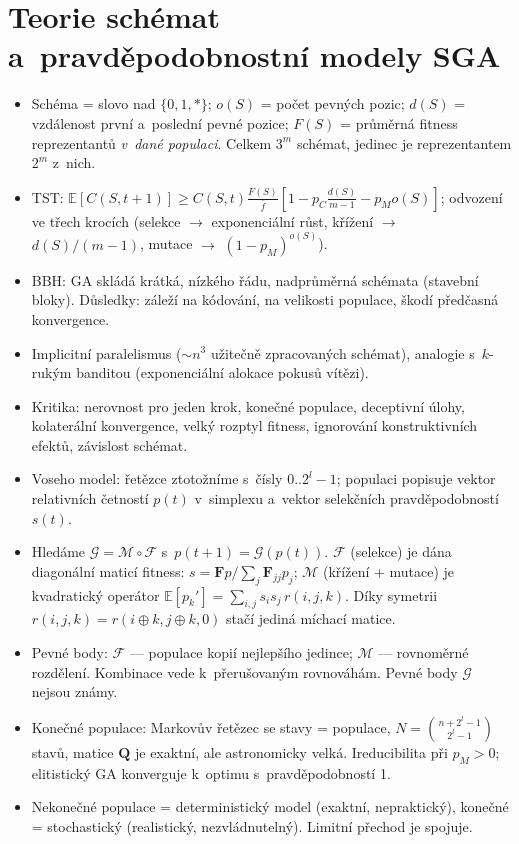 \documentclass[11pt,a4paper]{article}
\theoremstyle{definition}
\begin{document}
\section{Teorie schémat a~pravděpodobnostní modely SGA}
\begin{itemize}
\item Schéma = slovo nad $\{0,1,*\}$; $o(S)$ = počet pevných pozic;
 $d(S)$ = vzdálenost první a~poslední pevné pozice; $F(S)$ = průměrná fitness
 reprezentantů \emph{v~dané populaci}. Celkem $3^m$ schémat, jedinec je
 reprezentantem $2^m$ z~nich.
\item TST: $\mathbb{E}[C(S,t+1)] \ge C(S,t)\frac{F(S)}{\bar f}
 [1 - p_C \frac{d(S)}{m-1} - p_M o(S)]$; odvození ve třech krocích
 (selekce $\to$ exponenciální růst, křížení $\to$ $d(S)/(m-1)$,
 mutace $\to$ $(1-p_M)^{o(S)}$).
\item BBH: GA skládá krátká, nízkého řádu, nadprůměrná schémata (stavební
 bloky). Důsledky: záleží na kódování, na velikosti populace, škodí předčasná
 konvergence.
\item Implicitní paralelismus ($\sim n^3$ užitečně zpracovaných schémat),
 analogie s~$k$-rukým banditou (exponenciální alokace pokusů vítězi).
\item Kritika: nerovnost pro jeden krok, konečné populace, deceptivní úlohy,
 kolaterální konvergence, velký rozptyl fitness, ignorování konstruktivních
 efektů, závislost schémat.
\item Voseho model: řetězce ztotožníme s~čísly $0..2^l-1$; populaci popisuje
 vektor relativních četností $p(t)$ v~simplexu a~vektor selekčních
 pravděpodobností $s(t)$.
\item Hledáme $\mathcal{G} = \mathcal{M} \circ \mathcal{F}$ s~$p(t+1)=\mathcal{G}(p(t))$.
 $\mathcal{F}$ (selekce) je dána diagonální maticí fitness:
 $s = \mathbf{F}p / \sum_j \mathbf{F}_{jj}p_j$;
 $\mathcal{M}$ (křížení + mutace) je kvadratický operátor
 $\mathbb{E}[p_k'] = \sum_{i,j} s_i s_j\, r(i,j,k)$. Díky symetrii
 $r(i,j,k) = r(i\oplus k, j \oplus k, 0)$ stačí jediná míchací matice.
\item Pevné body: $\mathcal{F}$ --- populace kopií nejlepšího jedince;
 $\mathcal{M}$ --- rovnoměrné rozdělení. Kombinace vede k~přerušovaným
 rovnováhám. Pevné body $\mathcal{G}$ nejsou známy.
\item Konečné populace: Markovův řetězec se stavy = populace,
 $N = \binom{n+2^l-1}{2^l-1}$ stavů, matice $\mathbf{Q}$ je exaktní, ale
 astronomicky velká. Ireducibilita při $p_M>0$; elitistický GA konverguje
 k~optimu s~pravděpodobností 1.
\item Nekonečné populace = deterministický model (exaktní, nepraktický),
 konečné = stochastický (realistický, nezvládnutelný). Limitní přechod je
 spojuje.
\end{itemize}
\end{document}
